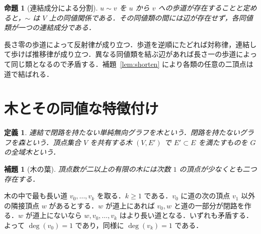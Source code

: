 \documentclass[a5paper,10pt,onecolumn]{jsarticle}
\makeatletter
\theoremstyle{mathnotetheorem}
\newtheorem{definition}[theorem]{定義}
\newtheorem{lemma}[theorem]{補題}
\newtheorem{proposition}[theorem]{命題}
\renewcommand{\proofname}{証明}
\renewenvironment{proof}[1][\proofname]{%
  \par\pushQED{\qed}\normalfont\topsep4\p@\@plus2\p@\relax
  \trivlist\item[\hskip\labelsep\bfseries #1]\ignorespaces
}{\popQED\endtrivlist\@endpefalse}
\makeatother
\begin{document}
\begin{proposition}[連結成分による分割]
$u\sim v$ を $u$ から $v$ への歩道が存在することと定めると，$\sim$ は $V$ 上の同値関係である．その同値類の間には辺が存在せず，各同値類が一つの連結成分である．
\end{proposition}
\begin{proof}
長さ零の歩道によって反射律が成り立つ．歩道を逆順にたどれば対称律，連結して歩けば推移律が成り立つ．異なる同値類を結ぶ辺があれば長さ一の歩道によって同じ類となるので矛盾する．補題~\ref{lem:shorten} により各類の任意の二頂点は道で結ばれる．
\end{proof}

\section{木とその同値な特徴付け}
\begin{definition}
連結で閉路を持たない単純無向グラフを\emph{木}という．閉路を持たないグラフを\emph{森}という．頂点集合 $V$ を共有する木 $(V,E')$ で $E'\subset E$ を満たすものを $G$ の\emph{全域木}という．
\end{definition}
\begin{lemma}[木の葉]\label{lem:leaf}
頂点数が二以上の有限の木には次数 $1$ の頂点が少なくとも二つ存在する．
\end{lemma}
\begin{proof}
木の中で最も長い道 $v_0,\dots,v_k$ を取る．$k\ge1$ である．$v_0$ に道の次の頂点 $v_1$ 以外の隣接頂点 $w$ があるとする．$w$ が道上にあれば $v_0,w$ と道の一部分が閉路を作る．$w$ が道上にないなら $w,v_0,\dots,v_k$ はより長い道となる．いずれも矛盾する．よって $\deg(v_0)=1$ であり，同様に $\deg(v_k)=1$ である．
\end{proof}
\end{document}

